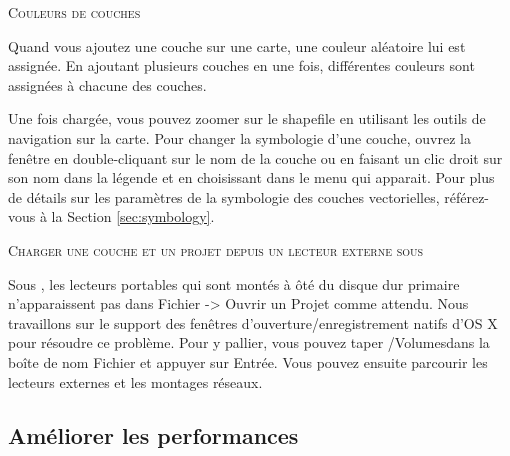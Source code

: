 \begin{Tip}\caption{\textsc{Couleurs de couches}}
Quand vous ajoutez une couche sur une carte, une couleur aléatoire lui est assignée. En ajoutant plusieurs couches en une fois, différentes couleurs sont assignées à chacune des couches.
\end{Tip}

Une fois chargée, vous pouvez zoomer sur le shapefile en utilisant les outils de navigation sur la carte.
Pour changer la symbologie d'une couche, ouvrez la fenêtre  en double-cliquant sur le nom de la couche ou en faisant un clic droit sur son nom dans la légende et en choisissant  dans le menu qui apparait. Pour plus de détails sur les paramètres de la symbologie des couches vectorielles, référez-vous à la Section \ref{sec:symbology}.

\begin{Tip}\caption{\textsc{Charger une couche et un projet depuis un lecteur externe sous \mac}}
Sous \mac, les lecteurs portables qui sont montés à ôté du disque dur primaire n'apparaissent pas dans Fichier -> Ouvrir un Projet comme attendu. Nous travaillons sur le support des fenêtres d'ouverture/enregistrement natifs d'OS X pour résoudre ce problème. Pour y pallier, vous pouvez taper \og /Volumes\fg dans la boîte de nom Fichier et appuyer sur Entrée. Vous pouvez ensuite parcourir les lecteurs externes et les montages réseaux.
\end{Tip}

\subsection{Améliorer les performances}

